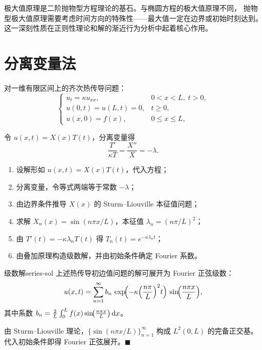 \documentclass[11pt,a4paper,openany,oneside]{ctexbook}
\begin{document}
\begin{remarkbox}
  极大值原理是二阶抛物型方程理论的基石。与椭圆方程的极大值原理不同，
  抛物型极大值原理需要考虑时间方向的特殊性——最大值一定在边界或初始时刻达到。
  这一深刻性质在正则性理论和解的渐近行为分析中起着核心作用。
\end{remarkbox}

\section{分离变量法}

对一维有限区间上的齐次热传导问题：
$$
\begin{cases}
  u_{t} = \kappa u_{xx}, & 0<x<L,\; t>0,\\[2pt]
  u(0,t)=u(L,t)=0, & t\ge 0,\\[2pt]
  u(x,0)=f(x), & 0\le x\le L,
\end{cases}
$$

令 $u(x,t)=X(x)T(t)$，分离变量得
$$
\frac{T'}{\kappa T} = \frac{X''}{X} = -\lambda.
$$

\begin{methodbox}[分离变量法求解步骤]
  \begin{enumerate}[label=\textbf{\sffamily\small 步骤 \arabic*.}, leftmargin=*]
    \item 设解形如 $u(x,t)=X(x)T(t)$，代入方程；
    \item 分离变量，令等式两端等于常数 $-\lambda$；
    \item 由边界条件推导 $X(x)$ 的 Sturm--Liouville 本征值问题；
    \item 求解 $X_{n}(x)=\sin(n\pi x/L)$，本征值 $\lambda_{n}=(n\pi/L)^{2}$；
    \item 由 $T'(t)=-\kappa\lambda_{n}T(t)$ 得 $T_{n}(t)=e^{-\kappa\lambda_{n}t}$；
    \item 由叠加原理构造级数解，并由初始条件确定 Fourier 系数。
  \end{enumerate}
\end{methodbox}

\begin{theorem}{级数解}{series-sol}
  上述热传导初边值问题的解可展开为 Fourier 正弦级数：
  $$
  u(x,t) = \sum_{n=1}^{\infty} b_{n}\,
           \exp\!\Bigl(-\kappa\Bigl(\frac{n\pi}{L}\Bigr)^{2}t\Bigr)\,
           \sin\!\Bigl(\frac{n\pi x}{L}\Bigr),
  $$
  其中系数 $b_{n}=\frac{2}{L}\int_{0}^{L} f(x)\sin\!\bigl(\frac{n\pi x}{L}\bigr)\,\mathrm{d} x$。
\end{theorem}

\begin{proofbox}
  由 Sturm--Liouville 理论，$\{\sin(n\pi x/L)\}_{n=1}^{\infty}$
  构成 $L^{2}(0,L)$ 的完备正交基。代入初始条件即得 Fourier 正弦展开。$\blacksquare$
\end{proofbox}
\end{document}
